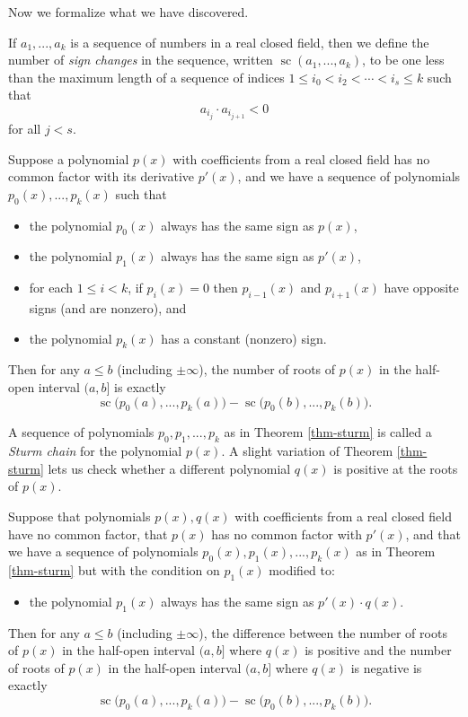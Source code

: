 Now we formalize what we have discovered.

\begin{defn} If $a_1, ..., a_k$ is a sequence of numbers in a real closed field, then we define the number of \emph{sign changes} in the sequence, written $\operatorname{sc}(a_1, ..., a_k)$, to be one less than the maximum length of a sequence of indices $1 \le i_0 < i_2 < \cdots < i_s \le k$ such that
\[
a_{i_j} \cdot a_{i_{j+1}} < 0
\]
for all $j < s$.
\end{defn}

\begin{thm}[Sturm]\label{thm-sturm} Suppose a polynomial $p(x)$ with coefficients from a real closed field has no common factor with its derivative $p'(x)$, and we have a sequence of polynomials $p_0(x), ..., p_k(x)$ such that
\begin{itemize}
\item the polynomial $p_0(x)$ always has the same sign as $p(x)$,

\item the polynomial $p_1(x)$ always has the same sign as $p'(x)$,

\item for each $1 \le i < k$, if $p_i(x) = 0$ then $p_{i-1}(x)$ and $p_{i+1}(x)$ have opposite signs (and are nonzero), and

\item the polynomial $p_k(x)$ has a constant (nonzero) sign.
\end{itemize}
Then for any $a \le b$ (including $\pm\infty$), the number of roots of $p(x)$ in the half-open interval $(a,b]$ is exactly
\[
\operatorname{sc}\big(p_0(a), ..., p_k(a)\big) - \operatorname{sc}\big(p_0(b), ..., p_k(b)\big).
\]
\end{thm}

A sequence of polynomials $p_0, p_1, ..., p_k$ as in Theorem \ref{thm-sturm} is called a \emph{Sturm chain} for the polynomial $p(x)$. A slight variation of Theorem \ref{thm-sturm} lets us check whether a different polynomial $q(x)$ is positive at the roots of $p(x)$.

\begin{thm} Suppose that polynomials $p(x),q(x)$ with coefficients from a real closed field have no common factor, that $p(x)$ has no common factor with $p'(x)$, and that we have a sequence of polynomials $p_0(x), p_1(x), ..., p_k(x)$ as in Theorem \ref{thm-sturm} but with the condition on $p_1(x)$ modified to:
\begin{itemize}
\item the polynomial $p_1(x)$ always has the same sign as $p'(x) \cdot q(x)$.
\end{itemize}
Then for any $a \le b$ (including $\pm\infty$), the difference between the number of roots of $p(x)$ in the half-open interval $(a,b]$ where $q(x)$ is positive and the number of roots of $p(x)$ in the half-open interval $(a,b]$ where $q(x)$ is negative is exactly
\[
\operatorname{sc}\big(p_0(a), ..., p_k(a)\big) - \operatorname{sc}\big(p_0(b), ..., p_k(b)\big).
\]
\end{thm}


